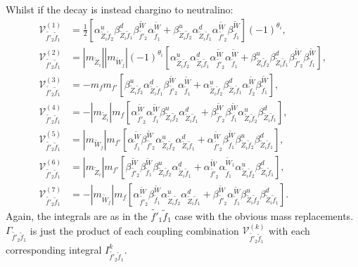 \documentclass[final,3p,times,pdflatex]{elsarticle}
\begin{document}
Whilst if the decay is instead chargino to neutralino:
\begin{align}
\mathcal{V}_{\tilde{f'}_2 \tilde{f}_1}^{(1)} &= \frac{1}{2}\left[\alpha_{\tilde{Z}_i \tilde{f}_2}^{u} \beta_{\tilde{Z}_i \tilde{f}_1}^{d} \beta_{\tilde{f'}_2}^{\tilde{W}}\alpha_{\tilde{f}_1}^{\tilde{W}} + \beta_{\tilde{Z}_i \tilde{f}_2}^{u} \alpha_{\tilde{Z}_i \tilde{f}_1}^{d} \alpha_{\tilde{f'}_2}^{\tilde{W}} \beta_{\tilde{f}_1}^{\tilde{W}}\right](-1)^{\theta_i}, \\
\mathcal{V}_{\tilde{f'}_2 \tilde{f}_1}^{(2)} &= |m_{\tilde{Z}_i}||m_{\tilde{W}_j}|(-1)^{\theta_i}\left[ \alpha_{\tilde{Z}_i \tilde{f}_2}^{u} \alpha_{\tilde{Z}_i \tilde{f}_1}^{d} \alpha_{\tilde{f'}_2}^{\tilde{W}} \alpha_{\tilde{f}_1}^{\tilde{W}} + \beta_{\tilde{Z}_i \tilde{f}_2}^{u} \beta_{\tilde{Z}_{i} \tilde{f}_1}^{d} \beta_{\tilde{f'}_2}^{\tilde{W}} \beta_{\tilde{f}_1}^{\tilde{W}}\right], \\
\mathcal{V}_{\tilde{f'}_2 \tilde{f}_1}^{(3)} &= -m_{f}m_{f'}\left[\beta_{\tilde{Z}_i \tilde{f}_2}^{u} \alpha_{\tilde{Z}_i \tilde{f}_1}^{d} \beta_{\tilde{f'}_2}^{\tilde{W}} \alpha_{\tilde{f}_1}^{\tilde{W}} +  \alpha_{\tilde{Z}_i \tilde{f}_2}^{u} \beta_{\tilde{Z}_i \tilde{f}_1}^{d} \alpha_{\tilde{f}_2}^{\tilde{W}} \beta_{\tilde{f}_1}^{\tilde{W}}\right], \\
\mathcal{V}_{\tilde{f'}_2 \tilde{f}_1}^{(4)} &= -|m_{\tilde{Z}_i}| m_{f} \left[\alpha_{\tilde{f'}_2}^{\tilde{W}} \alpha_{\tilde{f}_1}^{\tilde{W}} \beta_{\tilde{Z}_i \tilde{f}_2}^{u} \alpha_{\tilde{Z}_i \tilde{f}_1}^{d} + \beta_{\tilde{f'}_2}^{\tilde{W}} \beta_{\tilde{f}_1}^{\tilde{W}} \alpha_{\tilde{Z}_i \tilde{f}_2}^{u} \beta_{\tilde{Z}_i \tilde{f}_1}^{d}\right] ,\\
\mathcal{V}_{\tilde{f'}_2 \tilde{f}_1}^{(5)} &= |m_{\tilde{W}_j}|m_{f'} \left[\alpha_{\tilde{f}_1}^{\tilde{W}} \beta_{\tilde{f'}_2}^{\tilde{W}} \alpha_{\tilde{Z}_i \tilde{f}_2}^{u} \alpha_{\tilde{Z}_i \tilde{f}_1}^{d} + \alpha_{\tilde{f'}_2}^{\tilde{W}} \beta_{\tilde{f}_1}^{\tilde{W}} \beta_{\tilde{Z}_i \tilde{f}_2}^{u} \beta_{\tilde{Z}_i \tilde{f}_1}^{d}\right],\\
\mathcal{V}_{\tilde{f'}_2 \tilde{f}_1}^{(6)} &= |m_{\tilde{Z}_i}| m_{f'}\left[\beta_{\tilde{f'}_2}^{\tilde{W}}\beta_{\tilde{f}_1}^{\tilde{W}} \beta_{\tilde{Z}_i \tilde{f}_2}^{u} \alpha_{\tilde{Z}_i \tilde{f}_1}^{d} + \alpha_{\tilde{f'}_2}^{\tilde{W}} \alpha_{\tilde{f}_1}^{\tilde{W}_1} \alpha_{\tilde{Z}_i \tilde{f}_2}^{u} \beta_{\tilde{Z}_i \tilde{f}_1}^{d}\right], \\
\mathcal{V}_{\tilde{f'}_2 \tilde{f}_1}^{(7)} &= -|m_{\tilde{W}_j}|m_{f}\left[\alpha_{\tilde{f'}_2}^{\tilde{W}}\beta_{\tilde{f}_1}^{\tilde{W}} \alpha_{\tilde{Z}_i \tilde{f}_2}^{u} \alpha_{\tilde{Z}_i \tilde{f}_1}^{d} + \beta_{\tilde{f'}_2}^{\tilde{W}} \alpha_{\tilde{f}_1}^{\tilde{W}} \beta_{\tilde{Z}_i \tilde{f}_2}^{u} \beta_{\tilde{Z}_i \tilde{f}_1}^{d}\right].
\end{align}
Again, the integrals are as in the $\tilde{f'}_1 \tilde{f}_1$ case with the obvious mass replacements. $\Gamma_{\tilde{f'}_2 \tilde{f}_1}$ is just the product of each coupling combination $\mathcal{V}_{\tilde{f'}_2 \tilde{f}_1}^{(k)}$ with each corresponding integral $I_{\tilde{f'}_2 \tilde{f}_1}^{k}$.
\end{document}
